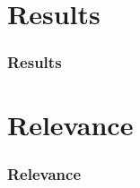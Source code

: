 \documentclass{beamer}
\begin{document}
\section{Results}
\begin{frame}
	\frametitle{Results}
\end{frame}

\section{Relevance}
\begin{frame}
	\frametitle{Relevance}
\end{frame}

\end{document}
